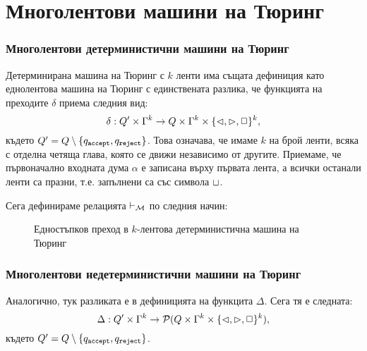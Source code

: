 \section{Многолентови машини на Тюринг}


\subsubsection*{Многолентови детерминистични машини на Тюринг}

Детерминирана машина на Тюринг с $k$ ленти има същата дефиниция като еднолентова машина на Тюринг
с единствената разлика, че функцията на преходите $\delta$ приема следния вид:
\[\delta: Q' \times \Gamma^k\to Q \times \Gamma^k \times \{\goleft,\goright,\stay\}^k,\]
където $Q' = Q \setminus\{\qaccept, \qreject\}$.
Това означава, че имаме $k$ на брой ленти, всяка с отделна четяща глава, която се движи независимо от другите.
Приемаме, че първоначално входната дума $\alpha$ е записана върху първата лента, а всички останали ленти са празни, т.е. запълнени са със символа $\blank$.


Сега дефинираме релацията $\vdash_\M$ по следния начин:

\begin{important}
  \begin{figure}[H]
    \centering
    \begin{prooftree}
    \end{prooftree}
    \caption{Едностъпков преход в $k$-лентова детерминистична машина на Тюринг}
  \end{figure}
\end{important}


\subsubsection*{Многолентови недетерминистични машини на Тюринг}


Аналогично, тук разликата е в дефиницията на функцита $\Delta$. Сега тя е следната:
\[\Delta: Q' \times \Gamma^k\to \mathcal{P}(Q \times \Gamma^k \times \{\goleft,\goright,\stay\}^k),\]
където $Q' = Q \setminus\{\qaccept, \qreject\}$.


